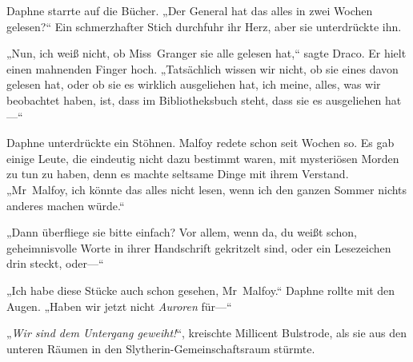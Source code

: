 Daphne starrte auf die Bücher.
„Der General hat das alles in zwei Wochen gelesen?“ Ein schmerzhafter Stich durchfuhr ihr Herz, aber sie unterdrückte ihn.

„Nun, ich weiß nicht, ob Miss~Granger sie alle gelesen hat,“ sagte Draco. Er hielt einen mahnenden Finger hoch. „Tatsächlich wissen wir nicht, ob sie eines davon gelesen hat, oder ob sie es wirklich ausgeliehen hat, ich meine, alles, was wir beobachtet haben, ist, dass im Bibliotheksbuch steht, dass sie es ausgeliehen hat—“

Daphne unterdrückte ein Stöhnen. Malfoy redete schon seit Wochen so. Es gab einige Leute, die eindeutig nicht dazu bestimmt waren, mit mysteriösen Morden zu tun zu haben, denn es machte seltsame Dinge mit ihrem Verstand.
„Mr~Malfoy, ich könnte das alles nicht lesen, wenn ich den ganzen Sommer nichts anderes machen würde.“

„Dann überfliege sie bitte einfach? Vor allem, wenn da, du weißt schon, geheimnisvolle Worte in ihrer Handschrift gekritzelt sind, oder ein Lesezeichen drin steckt, oder—“

„Ich habe diese Stücke auch schon gesehen, Mr~Malfoy.“ Daphne rollte mit den Augen. „Haben wir jetzt nicht \emph{Auroren} für—“

„\emph{Wir sind dem Untergang geweiht!}“, kreischte Millicent Bulstrode, als sie aus den unteren Räumen in den Slytherin-Gemeinschaftsraum stürmte.

